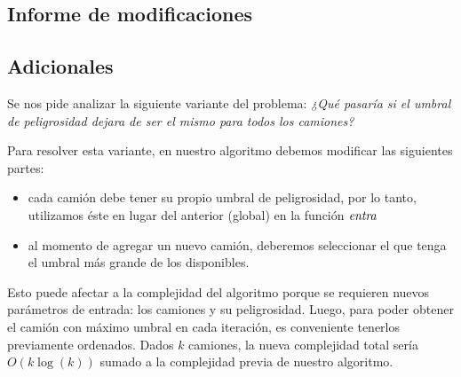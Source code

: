 \subsection{Informe de modificaciones}

\newpage

\subsection{Adicionales}

Se nos pide analizar la siguiente variante del problema:
\textit{¿Qué pasaría si el umbral de peligrosidad dejara de ser el mismo para todos los
camiones?}

Para resolver esta variante, en nuestro algoritmo debemos modificar las
siguientes partes:
\begin{itemize}
  \item cada camión debe tener su propio umbral de peligrosidad, por lo tanto, 
        utilizamos éste en lugar del anterior (global) en la función $\id{entra}$
  
  \item al momento de agregar un nuevo camión, deberemos seleccionar el que tenga
        el umbral más grande de los disponibles.
\end{itemize}

Esto puede afectar a la complejidad del algoritmo porque se requieren nuevos
parámetros de entrada: los camiones y su peligrosidad.
Luego, para poder obtener el camión con máximo umbral en cada iteración, es
conveniente tenerlos previamente ordenados.
Dados $k$ camiones, la nueva complejidad total sería $O(k \log(k))$ sumado a la
complejidad previa de nuestro algoritmo.
